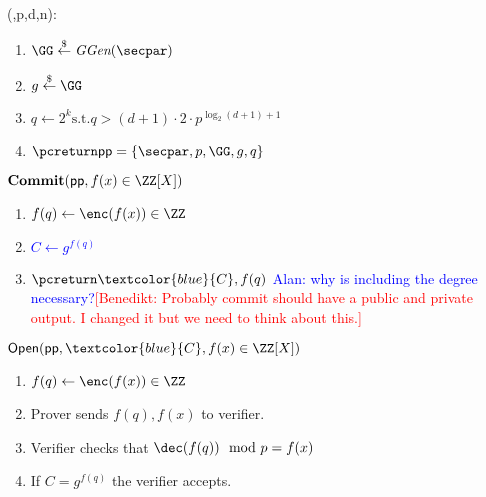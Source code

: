 \documentclass{article}
\theoremstyle{definition}
\newcommand{\benedikt}[1]{{\textcolor{red}{[Benedikt: #1]}}}
\newcommand{\benedikt}[1]{}
\begin{document}
\begin{mdframed}[userdefinedwidth=0.8\textwidth]
\begin{minipage}{\textwidth}
	\begin{flushleft}
	\setup(\secpar,p,d,n):
		\begin{enumerate}[nolistsep]
			\item $ \GG \sample \ggen(\secpar)$
			\item $ g \sample \GG$
			\item $q\gets 2^k \text{s.t.} q>(d+1) \cdot 2\cdot p^{\log_2(d+1)+1} $
			\item $\pcreturn \crs=\{\secpar,p,\GG,g,q\}$
		\end{enumerate}
		$\commit(\crs,f(x)\in \ZZ[X])$  
		\begin{enumerate}[nolistsep]
			\item 	$f(q)\gets \enc(f(x)) \in \ZZ$
			\item \textcolor{blue}{$C \gets g^{f(q)}$}
			\item $\pcreturn \textcolor{blue}{C},f(q)$ \textcolor{blue}{Alan: why is including the degree necessary?}\benedikt{Probably commit should have a public and private output. I changed it but we need to think about this.}
		\end{enumerate}
		$\open(\crs,\textcolor{blue}{C},f(x)\in \ZZ[X])$ \pccomment{\textcolor{blue}{$f(x)$'s coefficients are in $[-q/2,q/2]$}} 
		\begin{enumerate}[nolistsep]
			\item $f(q)\gets \enc(f(x)) \in \ZZ$
			\item Prover sends $f(q),f(x)$ to verifier.
			\item Verifier checks that $\dec(f(q)) \mod p=f(x)$
			\item If $C=g^{f(q)}$ the verifier accepts.
		\end{enumerate}
	\end{flushleft}
	
\end{minipage}
\end{mdframed}
\end{document}
